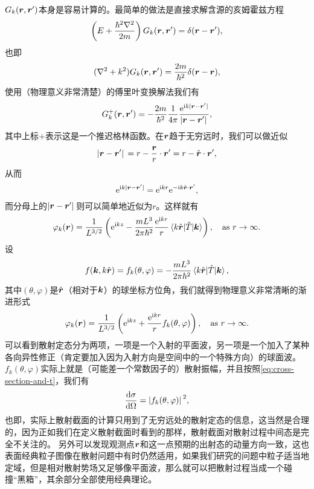 \documentclass[UTF8, a4paper]{ctexart}
\newcommand*{\ee}{\mathrm{e}}
\newcommand*{\ii}{\mathrm{i}}
\begin{document}
$G_k(\vb*{r}, \vb*{r}')$本身是容易计算的。最简单的做法是直接求解含源的亥姆霍兹方程
\[
    \left(E + \frac{\hbar^2 \laplacian}{2m} \right) G_k(\vb*{r}, \vb*{r}') = \delta(\vb*{r} - \vb*{r}'),
\]
也即
\[
    (\laplacian + k^2) G_k(\vb*{r}, \vb*{r}') = \frac{2m}{\hbar^2} \delta(\vb*{r} - \vb*{r}),
\]
使用（物理意义非常清楚）的傅里叶变换解法我们有
\[
    G_k^+(\vb*{r}, \vb*{r}') = - \frac{2m}{\hbar^2} \frac{1}{4\pi} \frac{\ee^{\ii k \abs*{\vb*{r} - \vb*{r}'}}}{\abs*{\vb*{r} - \vb*{r}'}},
\]
其中上标$+$表示这是一个推迟格林函数。在$\vb*{r}$趋于无穷远时，我们可以做近似
\[
    \abs*{\vb*{r} - \vb*{r}'} = r - \frac{\vb*{r}}{r} \cdot \vb*{r}' = r - \hat{\vb*{r}} \cdot \vb*{r}',
\]
从而
\[
    \ee^{\ii k \abs*{\vb*{r} - \vb*{r}'}} = \ee^{\ii k r} \ee^{- \ii k \hat{\vb*{r}} \cdot \vb*{r}'},
\]
而分母上的$\abs*{\vb*{r} - \vb*{r}'}$则可以简单地近似为$r$。这样就有
\[
    \varphi_k(\vb*{r}) = \frac{1}{L^{3/2}} \left( \ee^{\ii k z} - \frac{m L^3}{2\pi \hbar^2} \frac{\ee^{\ii k r}}{r} \mel{k \hat{\vb*{r}}}{\hat{T}}{\vb*{k}} \right) , \quad \text{as $r \to \infty$}.
\]
设
\begin{equation}
    f(\vb*{k}, k \hat{\vb*{r}}) = f_k(\theta, \varphi) = - \frac{m L^3}{2\pi \hbar^2} \mel{k \hat{\vb*{r}}}{\hat{T}}{\vb*{k}} ,
    \label{eq:scattering-amp}
\end{equation}
其中$(\theta, \varphi)$是$\hat{\vb*{r}}$（相对于$\vb*{k}$）的球坐标方位角，我们就得到物理意义非常清晰的渐进形式
\begin{equation}
    \varphi_k(\vb*{r}) = \frac{1}{L^{3/2}} \left( \ee^{\ii k z} + \frac{\ee^{\ii k r}}{r} f_k(\theta, \varphi) \right) , \quad \text{as $r \to \infty$}.
    \label{eq:infty-in-box}
\end{equation}
可以看到散射定态分为两项，一项是一个入射的平面波，另一项是一个加入了某种各向异性修正（肯定要加入因为入射方向是空间中的一个特殊方向）的球面波。$f_k(\theta, \varphi)$实际上就是（可能差一个常数因子的）散射振幅，并且按照\eqref{eq:cross-section-and-t}，我们有
\begin{equation}
    \dv{\sigma}{\Omega} = \abs*{f_k(\theta, \varphi)}^2,
    \label{eq:cross-section-and-f}
\end{equation}
也即，实际上散射截面的计算只用到了无穷远处的散射定态的信息，这当然是合理的，因为正如我们在定义散射截面时看到的那样，散射截面对散射过程中间态是完全不关注的。
另外可以发现观测点$\vb*{r}$和这一点预期的出射态的动量方向一致，这也表面经典粒子图像在散射问题中有时仍然适用，如果我们研究的问题中粒子适当地定域，但是相对散射势场又足够像平面波，那么就可以把散射过程当成一个碰撞“黑箱”，其余部分全部使用经典理论。
\end{document}
